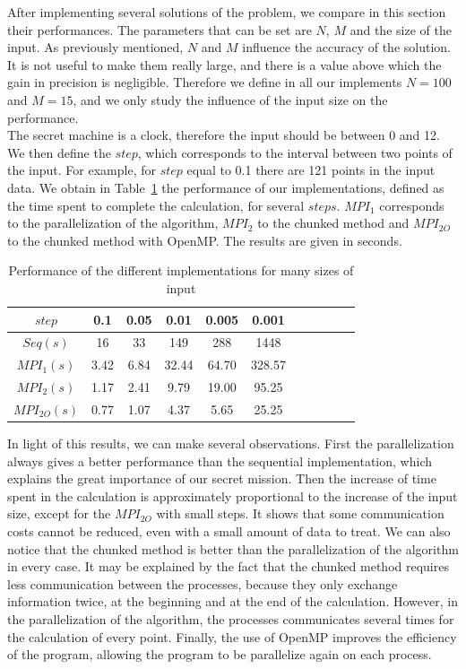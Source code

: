 \documentclass[11pt,a4paper]{article}
\begin{document}
After implementing several solutions of the problem, we compare in this section their performances. The parameters that can be set are $N$, $M$ and the size of the input. As previously mentioned, $N$ and $M$ influence the accuracy of the solution. It is not useful to make them really large, and there is a value above which the gain in precision is negligible. Therefore we define in all our implements $N=100$ and $M=15$, and we only study the influence of the input size on the performance.\\

The secret machine is a clock, therefore the input should be between 0 and 12. We then define the $step$, which corresponds to the interval between two points of the input. For example, for $step$ equal to 0.1 there are 121 points in the input data. We obtain in Table~\ref{table:comparison} the performance of our implementations, defined as the time spent to complete the calculation, for several $steps$. $MPI_1$ corresponds to the parallelization of the algorithm, $MPI_2$ to the chunked method and $MPI_{2O}$ to the chunked method with OpenMP. The results are given in seconds.

\begin{table}[h]
\centering
\begin{tabular}{|c|c|c|c|c|c|c|c|c|c|c|}
  \hline
  $step$ & 0.1 & 0.05 & 0.01 & 0.005 & 0.001\\ 
  \hline
  $Seq(s)$ & 16 & 33 & 149 & 288 & 1448\\
  \hline
   $MPI_1(s)$ & 3.42 & 6.84 & 32.44 & 64.70 & 328.57\\
  \hline
   $MPI_2(s)$ & 1.17 & 2.41 & 9.79 & 19.00 & 95.25\\
  \hline
   $MPI_{2O}(s)$ & 0.77 & 1.07 & 4.37 & 5.65 & 25.25\\
  \hline
  \end{tabular}
\caption{\label{table:comparison} Performance of the different implementations for many sizes of input}
\end{table}

In light of this results, we can make several observations. First the parallelization always gives a better performance than the sequential implementation, which explains the great importance of our secret mission. Then the increase of time spent in the calculation is approximately proportional to the increase of the input size, except for the $MPI_{2O}$ with small steps. It shows that some communication costs cannot be reduced, even with a small amount of data to treat. We can also notice that the chunked method is better than the parallelization of the algorithm in every case. It may be explained by the fact that the chunked method requires less communication between the processes, because they only exchange information twice, at the beginning and at the end of the calculation. However, in the parallelization of the algorithm, the processes communicates several times for the calculation of every point. Finally, the use of OpenMP improves the efficiency of the program, allowing the program to be parallelize again on each process. \\
\end{document}
